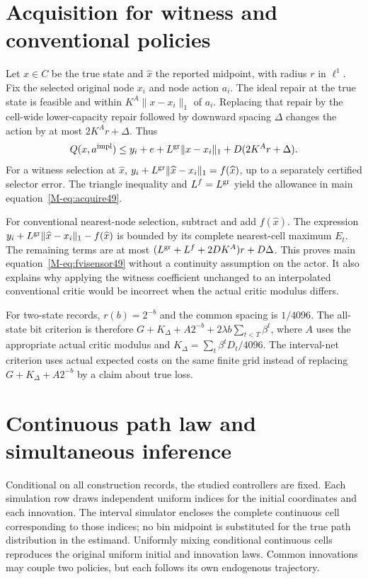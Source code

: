 \documentclass[ecta,nameyear,draft]{econsocart}
\begin{document}
\section{Acquisition for witness and conventional policies}\label{supp:acquisition49}
Let $x\in C$ be the true state and $\widehat x$ the reported midpoint, with radius $r$ in $\ell^1$. Fix the selected original node $x_i$ and node action $a_i$. The ideal repair at the true state is feasible and within $K^A\|x-x_i\|_1$ of $a_i$. Replacing that repair by the cell-wide lower-capacity repair followed by downward spacing $\Delta$ changes the action by at most $2K^Ar+\Delta$. Thus
\[
 Q(x,a^{\rm impl})\le y_i+e+L^{\rm gr}\|x-x_i\|_1+ D(2K^Ar+\Delta).
\]
For a witness selection at $\widehat x$, $y_i+L^{\rm gr}\|\widehat x-x_i\|_1=f(\widehat x)$, up to a separately certified selector error. The triangle inequality and $L^f=L^{\rm gr}$ yield the allowance in main equation~\eqref{M-eq:acquire49}.

For conventional nearest-node selection, subtract and add $f(\widehat x)$. The expression $y_i+L^{\rm gr}\|\widehat x-x_i\|_1-f(\widehat x)$ is bounded by its complete nearest-cell maximum $E_t$. The remaining terms are at most $(L^{\rm gr}+L^f+2DK^A)r+D\Delta$. This proves main equation~\eqref{M-eq:fvisensor49} without a continuity assumption on the actor. It also explains why applying the witness coefficient unchanged to an interpolated conventional critic would be incorrect when the actual critic modulus differs.

For two-state records, $r(b)=2^{-b}$ and the common spacing is $1/4096$. The all-state bit criterion is therefore $G+K_\Delta+A2^{-b}+2\lambda b\sum_{t<T}\beta^t$, where $A$ uses the appropriate actual critic modulus and $K_\Delta=\sum_t\beta^tD_t/4096$. The interval-net criterion uses actual expected costs on the same finite grid instead of replacing $G+K_\Delta+A2^{-b}$ by a claim about true loss.

\section{Continuous path law and simultaneous inference}\label{supp:inference49}
Conditional on all construction records, the studied controllers are fixed. Each simulation row draws independent uniform indices for the initial coordinates and each innovation. The interval simulator encloses the complete continuous cell corresponding to those indices; no bin midpoint is substituted for the true path distribution in the estimand. Uniformly mixing conditional continuous cells reproduces the original uniform initial and innovation laws. Common innovations may couple two policies, but each follows its own endogenous trajectory.
\end{document}

